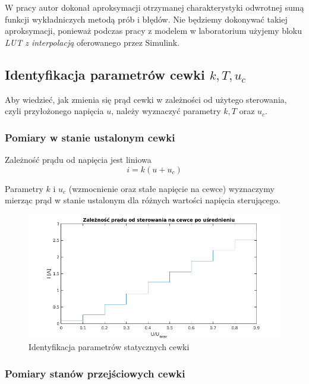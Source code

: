 W pracy \cite{Bania1999} autor dokonał aproksymacji otrzymanej charakterystyki odwrotnej sumą funkcji wykładniczych metodą prób i błędów. Nie będziemy dokonywać takiej aproksymacji, ponieważ podczas pracy z modelem w laboratorium użyjemy bloku \textit{LUT z interpolacją} oferowanego przez Simulink.



\subsection{Identyfikacja parametrów cewki $k, T, u_c$ }

Aby wiedzieć, jak zmienia się prąd cewki w zależności od użytego sterowania, czyli przyłożonego napięcia $u$, należy wyznaczyć parametry $k, T$ oraz $u_c$.

\subsubsection{Pomiary w stanie ustalonym cewki}

Zależność prądu od napięcia jest liniowa
\begin{equation}
i = k(u + u_c)
\end{equation}

Parametry $k$ i $u_c$ (wzmocnienie oraz stałe napięcie na cewce) wyznaczymy mierząc prąd w stanie ustalonym dla różnych wartości napięcia sterującego.


\begin{figure}[!htb]
\centering
\includegraphics[scale=0.85]{img/prad_cewki_od_sterowania.png}
\caption{Identyfikacja parametrów statycznych cewki}
\label{rys:cewka_k_uc}
\end{figure}

\subsubsection{Pomiary stanów przejściowych cewki}

